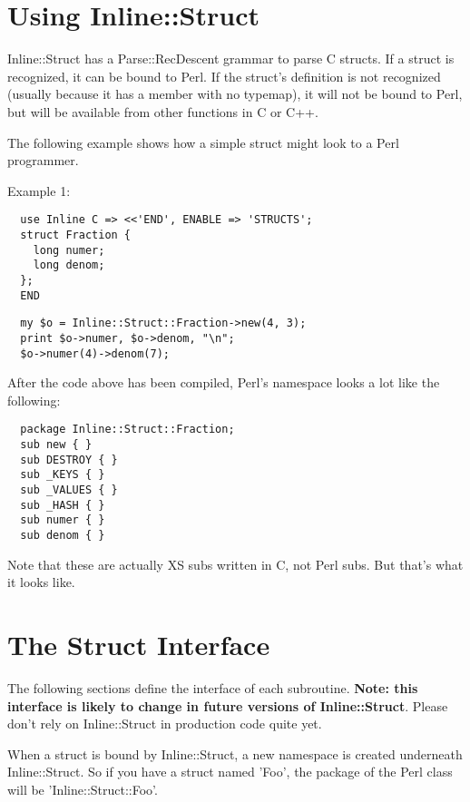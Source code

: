 \documentclass{article}
\begin{document}
\section{Using Inline::Struct\label{Using_Inline::Struct}}


Inline::Struct has a Parse::RecDescent grammar to parse C structs. If a struct
is recognized, it can be bound to Perl. If the struct's definition is not
recognized (usually because it has a member with no typemap), it will not be
bound to Perl, but will be available from other functions in C or C++.



The following example shows how a simple struct might look to a Perl
programmer.



Example 1:

\begin{verbatim}
  use Inline C => <<'END', ENABLE => 'STRUCTS';
  struct Fraction {
    long numer;
    long denom; 
  };
  END
\end{verbatim}
\begin{verbatim}
  my $o = Inline::Struct::Fraction->new(4, 3);
  print $o->numer, $o->denom, "\n";
  $o->numer(4)->denom(7);
\end{verbatim}


After the code above has been compiled, Perl's namespace looks a lot like
the following:

\begin{verbatim}
  package Inline::Struct::Fraction;
  sub new { }
  sub DESTROY { }
  sub _KEYS { }
  sub _VALUES { }
  sub _HASH { }
  sub numer { }
  sub denom { }
\end{verbatim}


Note that these are actually XS subs written in C, not Perl subs. But that's 
what it looks like.

\section{The Struct Interface\label{The_Struct_Interface}}


The following sections define the interface of each subroutine. \textbf{Note: this 
interface is likely to change in future versions of Inline::Struct}. Please
don't rely on Inline::Struct in production code quite yet.



When a struct is bound by Inline::Struct, a new namespace is created underneath
Inline::Struct. So if you have a struct named 'Foo', the package of the Perl
class will be 'Inline::Struct::Foo'.
\end{document}
